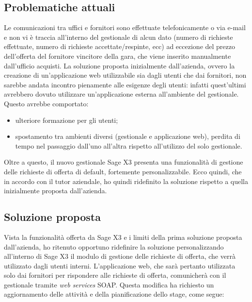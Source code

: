\subsection{Problematiche attuali}
Le comunicazioni tra uffici e fornitori sono effettuate telefonicamente o via e-mail e non vi è traccia all'interno del gestionale di alcun dato (numero di richieste effettuate, numero di richieste accettate/respinte, ecc) ad eccezione del prezzo dell'offerta del fornitore vincitore della gara, che viene inserito manualmente dall'ufficio acquisti.
La soluzione proposta inizialmente dall'azienda, ovvero la creazione di un'applicazione web utilizzabile sia dagli utenti che dai fornitori, non sarebbe andata incontro pienamente alle esigenze degli utenti: infatti quest'ultimi avrebbero dovuto utilizzare un'applicazione esterna all'ambiente del gestionale. 
Questo avrebbe comportato:
\begin{itemize}
	\item ulteriore formazione per gli utenti;
	\item spostamento tra ambienti diversi (gestionale e applicazione web), perdita di tempo nel passaggio dall'uno all'altra rispetto all'utilizzo del solo gestionale.
\end{itemize}
Oltre a questo, il nuovo gestionale Sage X3 presenta una funzionalità di gestione delle richieste di offerta di default, fortemente personalizzabile.
Ecco quindi, che in accordo con il tutor aziendale, ho quindi ridefinito la soluzione rispetto a quella inizialmente proposta dall'azienda.

\subsection{Soluzione proposta}
Vista la funzionalità offerta da Sage X3 e i limiti della prima soluzione proposta dall'azienda, ho ritenuto opportuno ridefinire la soluzione personalizzando all'interno di Sage X3 il modulo di gestione delle richieste di offerta, che verrà utilizzato dagli utenti interni.
L'applicazione web, che sarà pertanto utilizzata solo dai fornitori per rispondere alle richieste di offerta, comunicherà con il gestionale tramite \textit{web services} SOAP.
Questa modifica ha richiesto un aggiornamento delle attività e della pianificazione dello stage, come segue:

